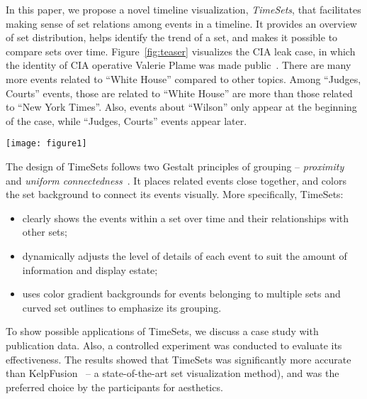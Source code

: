 In this paper, we propose a novel timeline visualization, \emph{TimeSets}, that facilitates making sense of set relations among events in a timeline. It provides an overview of set distribution, helps identify the trend of a set, and makes it possible to compare sets over time. Figure~\ref{fig:teaser} visualizes the CIA leak case, in which the identity of CIA operative Valerie Plame was made public~\cite{CIA2007}. There are many more events related to ``White House'' compared to other topics. Among ``Judges, Courts'' events, those are related to ``White House'' are more than those related to ``New York Times''. Also, events about ``Wilson'' only appear at the beginning of the case, while ``Judges, Courts'' events appear later.

\begin{figure*}[ht]
	\centering
	\texttt{[image: figure1]}
	\caption{TimeSets visualization of the CIA leak case~\cite{CIA2007}. The timeline contains events that happened from 2002 to 2007, each has a timestamp or an interval, a label, and topics such as ``White House''. Events are positioned along the horizontal time axis based on timestamps, and vertically grouped by topics. A time-point event is shown with a white circle to its left, and an interval event with a horizontal bar on top showing its timespan. Each topic has a unique color (see the legend in the bottom right corner), and events shared by two topics have gradient backgrounds, transitioning between the colors of the two topics.}
	\label{fig:teaser}
\end{figure*}

The design of TimeSets follows two Gestalt principles of grouping -- \textit{proximity} and \textit{uniform connectedness}~\cite{Koffka1935}. It places related events close together, and colors the set background to connect its events visually. More specifically, TimeSets:
\begin{itemize}
	\item clearly shows the events within a set over time and their relationships with other sets; 
	\item dynamically adjusts the level of details of each event to suit the amount of information and display estate;
	\item uses color gradient backgrounds for events belonging to multiple sets and curved set outlines to emphasize its grouping.
\end{itemize}

To show possible applications of TimeSets, we discuss a case study with publication data. Also, a controlled experiment was conducted to evaluate its effectiveness. The results showed that TimeSets was significantly more accurate than KelpFusion~\cite{Meulemans2013} -- a state-of-the-art set visualization method), and was the preferred choice by the participants for aesthetics.